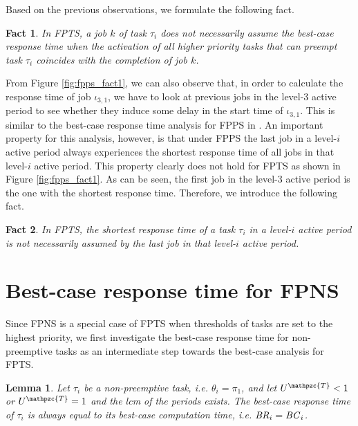 \documentclass[conference,compsoc]{IEEEtran}
\newtheorem{fact}{Fact}
\newtheorem{lemma}{Lemma}
\newcommand{\bc}    {\mbox{\it BC}}
\newcommand{\br}    {\mbox{\it BR}}
\begin{document}
Based on the previous observations, we formulate the following fact.

\begin{fact}
	In FPTS, a job $k$ of task $\tau_i$ does not necessarily assume the best-case response time when the activation of all higher priority tasks that can preempt task $\tau_i$ coincides with the completion of job $k$.
\end{fact}

From Figure \ref{fig:fpps_fact1}, we can also observe that, in order to calculate the response time of job $\iota_{3,1}$, we have to look at previous jobs in the level-3 active period to see whether they induce some delay in the start time of $\iota_{3,1}$. This is similar to the best-case response time analysis for FPPS in \cite{BLM13}. An important property for this analysis, however, is that under FPPS the last job in a level-$i$ active period always experiences the shortest response time of all jobs in that level-$i$ active period. This property clearly does not hold for FPTS as shown in Figure \ref{fig:fpps_fact1}. As can be seen, the first job in the level-3 active period is the one with the shortest response time. Therefore, we introduce the following fact.

\begin{fact}
	In FPTS, the shortest response time of a task $\tau_i$ in a level-$i$ active period is not necessarily assumed by the last job in that level-$i$ active period.
\end{fact}

\section{Best-case response time for FPNS}
Since FPNS is a special case of FPTS when thresholds of tasks are set to the highest priority, we first investigate the best-case response time for non-preemptive tasks as an intermediate step towards the best-case analysis for FPTS.

\begin{lemma}
	\textit{Let $\tau_i$ be a non-preemptive task, i.e. $\theta_i = \pi_1$, and let $U^{\mathpzc{T}}<1$ or $U^{\mathpzc{T}}=1$ and the lcm of the periods exists. The \textit{best-case response time} of $\tau_i$ is always equal to its \textit{best-case computation time}, i.e. $\br_i = \bc_i$.}
\end{lemma}
\end{document}
